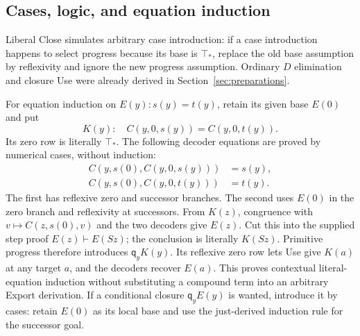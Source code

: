 \documentclass[11pt,letterpaper]{article}
\theoremstyle{definition}\newtheorem{definition}[theorem]{Definition}
\theoremstyle{remark}\newtheorem{remark}[theorem]{Remark}
\newcommand{\qq}{\mathsf q}
\newcommand{\ttop}{\top_*}
\begin{document}
\subsection{Cases, logic, and equation induction}
Liberal Close simulates arbitrary case introduction: if a case
introduction happens to select progress because its base is $\ttop$,
replace the old base assumption by reflexivity and ignore the new
progress assumption. Ordinary $D$ elimination and closure Use were
already derived in Section~\ref{sec:preparations}.

For equation induction on $E(y):s(y)=t(y)$, retain its given base
$E(0)$ and put
\[
 K(y):\quad C(y,0,s(y))=C(y,0,t(y)).
\]
Its zero row is literally $\ttop$. The following decoder equations are
proved by numerical cases, without induction:
\begin{align*}
 C(y,s(0),C(y,0,s(y)))&=s(y),\\
 C(y,s(0),C(y,0,t(y)))&=t(y).
\end{align*}
The first has reflexive zero and successor branches. The second uses
$E(0)$ in the zero branch and reflexivity at successors. From $K(z)$,
congruence with $v\mapsto C(z,s(0),v)$ and the two decoders give $E(z)$.
Cut this into the supplied step proof $E(z)\vdash E(Sz)$; the conclusion
is literally $K(Sz)$. Primitive progress therefore introduces $\qq_yK(y)$.
Its reflexive zero row lets Use give $K(a)$ at any target $a$, and the
decoders recover $E(a)$. This proves contextual literal-equation induction
without substituting a compound term into an arbitrary Export derivation.
If a conditional closure $\qq_yE(y)$ is wanted, introduce it by cases:
retain $E(0)$ as its local base and use the just-derived induction rule
for the successor goal.
\end{document}
